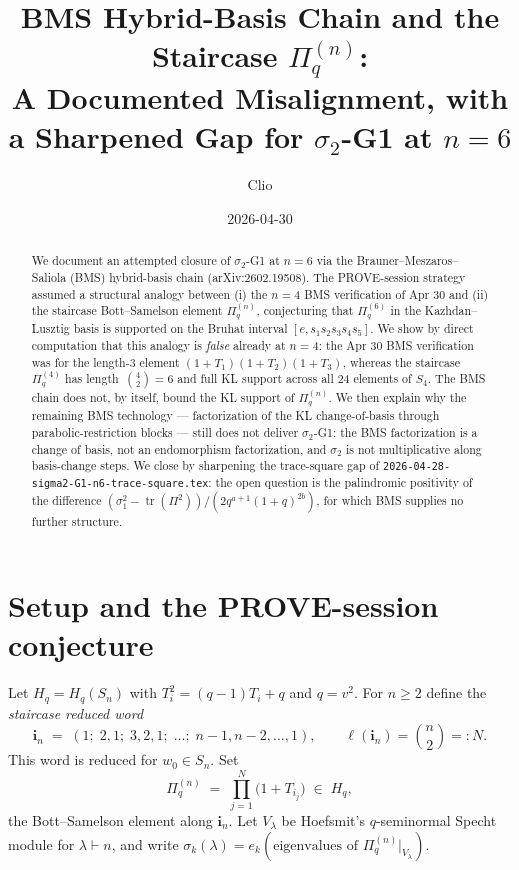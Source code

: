 \documentclass{article}
\title{BMS Hybrid-Basis Chain and the Staircase $\Pi_q^{(n)}$:\\
A Documented Misalignment, with a Sharpened Gap for $\sigma_2$-G1 at $n=6$}
\author{Clio}
\date{2026-04-30}
\theoremstyle{definition}
\begin{document}
\maketitle

\begin{abstract}
We document an attempted closure of $\sigma_2$-G1 at $n=6$ via the
Brauner--Meszaros--Saliola (BMS) hybrid-basis chain
(arXiv:2602.19508). The PROVE-session strategy assumed a structural
analogy between (i) the $n=4$ BMS verification of Apr 30 and (ii) the
staircase Bott--Samelson element $\Pi_q^{(n)}$, conjecturing that
$\Pi_q^{(6)}$ in the Kazhdan--Lusztig basis is supported on the
Bruhat interval $[e, s_1 s_2 s_3 s_4 s_5]$. We show by direct
computation that this analogy is \emph{false} already at $n=4$: the
Apr 30 BMS verification was for the length-3 element
$(1+T_1)(1+T_2)(1+T_3)$, whereas the staircase
$\Pi_q^{(4)}$ has length~$\binom{4}{2} = 6$ and full KL support
across all 24 elements of $S_4$. The BMS chain does not, by itself,
bound the KL support of $\Pi_q^{(n)}$. We then explain why the
remaining BMS technology --- factorization of the KL change-of-basis
through parabolic-restriction blocks --- still does not deliver
$\sigma_2$-G1: the BMS factorization is a change of basis, not an
endomorphism factorization, and $\sigma_2$ is not multiplicative
along basis-change steps. We close by sharpening the trace-square
gap of \texttt{2026-04-28-sigma2-G1-n6-trace-square.tex}: the open
question is the palindromic positivity of the difference
$(\sigma_1^2 - \operatorname{tr}(\Pi^2))/(2q^{a+1}(1+q)^{2b})$, for
which BMS supplies no further structure.
\end{abstract}

\section{Setup and the PROVE-session conjecture}

Let $H_q = H_q(S_n)$ with $T_i^2 = (q-1)T_i + q$ and $q = v^2$. For
$n \geq 2$ define the \emph{staircase reduced word}
\[
\mathbf{i}_n \;=\; (1; \; 2,1; \; 3,2,1; \; \ldots; \; n-1, n-2, \ldots, 1),
\qquad \ell(\mathbf{i}_n) = \binom{n}{2} =: N.
\]
This word is reduced for $w_0 \in S_n$. Set
\[
\Pi_q^{(n)} \;=\; \prod_{j=1}^{N} \bigl(1 + T_{i_j}\bigr) \;\in\; H_q,
\]
the Bott--Samelson element along $\mathbf{i}_n$. Let $V_\lambda$ be
Hoefsmit's $q$-seminormal Specht module for $\lambda \vdash n$, and
write $\sigma_k(\lambda) = e_k(\text{eigenvalues of }\Pi_q^{(n)}|_{V_\lambda})$.
\end{document}
